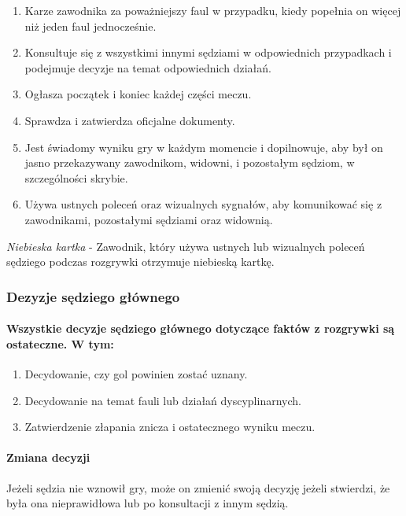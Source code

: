 \documentclass[12pt]{article}
\begin{document}
\begin{enumerate}
	\item Karze zawodnika za poważniejszy faul w przypadku, kiedy popełnia on
	      więcej niż jeden faul jednocześnie.

	\item Konsultuje się z wszystkimi innymi sędziami w odpowiednich
	      przypadkach i podejmuje decyzje na temat odpowiednich działań.

	\item Ogłasza początek i koniec każdej części meczu.

	\item Sprawdza i zatwierdza oficjalne dokumenty.

	\item Jest świadomy wyniku gry w każdym momencie i dopilnowuje, aby był on
	      jasno przekazywany zawodnikom, widowni, i pozostałym sędziom, w
	      szczególności skrybie.

	\item Używa ustnych poleceń oraz wizualnych sygnałów, aby komunikować się z
	      zawodnikami, pozostałymi sędziami oraz widownią.
\end{enumerate}

\emph{Niebieska kartka} - Zawodnik, który używa ustnych lub wizualnych
poleceń sędziego podczas rozgrywki otrzymuje niebieską kartkę.

\subsubsection{Dezyzje sędziego głównego}

\paragraph{Wszystkie decyzje sędziego głównego dotyczące faktów z
	rozgrywki są ostateczne. W tym:}
\begin{enumerate}
	\item Decydowanie, czy gol powinien zostać uznany.

	\item Decydowanie na temat fauli lub działań dyscyplinarnych.

	\item Zatwierdzenie złapania znicza i ostatecznego wyniku meczu.
\end{enumerate}

\paragraph{Zmiana decyzji}
Jeżeli sędzia nie wznowił gry, może
on zmienić swoją decyzję jeżeli stwierdzi, że była ona nieprawidłowa lub
po konsultacji z innym sędzią.
\end{document}
